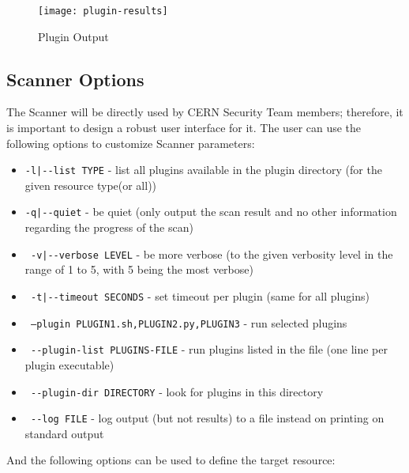 \begin{figure}[h!]
  \centering
    \texttt{[image: plugin-results]}
  \caption{Plugin Output}
  \label{figure:plugin-results}
  
\end{figure}



\subsection{Scanner Options}
The Scanner will be directly used by CERN Security Team members; therefore, it is important to design a robust user interface for it. The user can use the following options to customize Scanner parameters:

\begin{itemize}

\item 

    \texttt{-l|-{}-list TYPE} - list all plugins available in the plugin directory 
                       (for the given resource type(or all))
\item    \texttt{-q|-{}-quiet} - be quiet (only output the scan result and no other information regarding the progress of the scan)
\item    \texttt{    -v|-{}-verbose LEVEL} - be more verbose 
    	 				 (to the given verbosity level in the range of 1 to 5,
    	 				  with 5 being the most verbose)
\item    \texttt{    -t|-{}-timeout SECONDS} - set timeout per plugin (same for all plugins)
\item    \texttt{    --plugin PLUGIN1.sh,PLUGIN2.py,PLUGIN3} - run selected plugins
\item    \texttt{ -{}-plugin-list PLUGINS-FILE} - run plugins listed in the file (one line per plugin executable)
\item    \texttt{  -{}-plugin-dir DIRECTORY} - look for plugins in this directory %
\item    \texttt{    -{}-log FILE} - log output (but not results) to a file instead on printing on standard output  
\end{itemize}
And the following options can be used to define the target resource:
